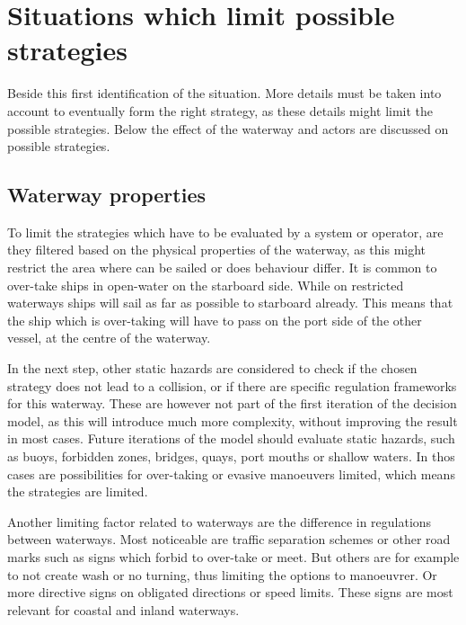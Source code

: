 \clearpage


\section{Situations which limit possible strategies}
Beside this first identification of the situation. More details must be taken into account to eventually form the right strategy, as these details might limit the possible strategies. Below the effect of the waterway and actors are discussed on possible strategies.

\subsection{Waterway properties}
To limit the strategies which have to be evaluated by a system or operator, are they filtered based on the physical properties of the waterway, as this might restrict the area where can be sailed or does behaviour differ. It is common to over-take ships in open-water on the starboard side. While on restricted waterways ships will sail as far as possible to starboard already. This means that the ship which is over-taking will have to pass on the port side of the other vessel, at the centre of the waterway.

In the next step, other static hazards are considered to check if the chosen strategy does not lead to a collision, or if there are specific regulation frameworks for this waterway. These are however not part of the first iteration of the decision model, as this will introduce much more complexity, without improving the result in most cases. Future iterations of the model should evaluate static hazards, such as buoys, forbidden zones, bridges, quays, port mouths or shallow waters. In thos cases are possibilities for over-taking or evasive manoeuvers limited, which means the strategies are limited.

Another limiting factor related to waterways are the difference in regulations between waterways. Most noticeable are traffic separation schemes or other road marks such as signs which forbid to over-take or meet. But others are for example to not create wash or no turning, thus limiting the options to manoeuvrer. Or more directive signs on obligated directions or speed limits. These signs are most relevant for coastal and inland waterways.

